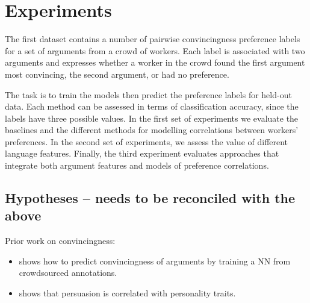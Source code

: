 \section{Experiments}\label{sec:expts}

The first dataset contains a number of pairwise convincingness preference labels for a set of arguments from a crowd of workers. Each label is associated with two arguments and expresses whether a worker in the crowd found the first argument most convincing, the second argument, or had no preference.  

The task is to train the models then predict the preference labels for held-out data. Each method can be assessed in terms of classification accuracy, since the labels have three possible values. In the first set of experiments we evaluate the baselines and the different methods for modelling correlations between workers' preferences. In the second set of experiments, we assess the value of different language features. Finally, the third experiment evaluates approaches that integrate both argument features and models of preference correlations.

\subsection{Hypotheses -- needs to be reconciled with the above} 

Prior work on convincingness:
\begin{itemize}
 \item \cite{habernal2016argument} shows how to predict convincingness of arguments by training a NN 
 from crowdsourced annotations. 
 \item \cite{lukin2017argument} shows that persuasion is correlated with personality traits.
\end{itemize}

